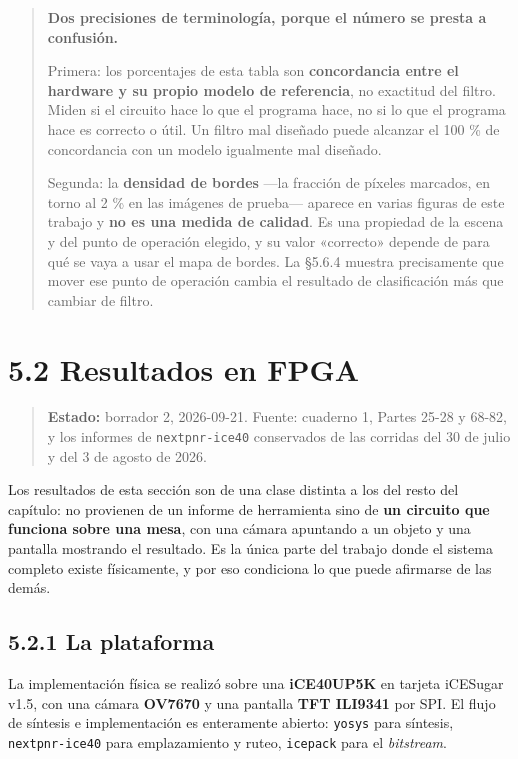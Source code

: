 \begin{quote}
\textbf{Dos precisiones de terminología, porque el número se presta a
confusión.}

Primera: los porcentajes de esta tabla son \textbf{concordancia entre el
hardware y su propio modelo de referencia}, no exactitud del filtro.
Miden si el circuito hace lo que el programa hace, no si lo que el
programa hace es correcto o útil. Un filtro mal diseñado puede alcanzar
el 100 \% de concordancia con un modelo igualmente mal diseñado.

Segunda: la \textbf{densidad de bordes} ---la fracción de píxeles
marcados, en torno al 2 \% en las imágenes de prueba--- aparece en
varias figuras de este trabajo y \textbf{no es una medida de calidad}.
Es una propiedad de la escena y del punto de operación elegido, y su
valor «correcto» depende de para qué se vaya a usar el mapa de bordes.
La §5.6.4 muestra precisamente que mover ese punto de operación cambia
el resultado de clasificación más que cambiar de filtro.
\end{quote}

\section{5.2 Resultados en FPGA}\label{resultados-en-fpga}

\begin{quote}
\textbf{Estado:} borrador 2, 2026-09-21. Fuente: cuaderno 1, Partes
25-28 y 68-82, y los informes de \texttt{nextpnr-ice40} conservados de
las corridas del 30 de julio y del 3 de agosto de 2026.
\end{quote}

Los resultados de esta sección son de una clase distinta a los del resto
del capítulo: no provienen de un informe de herramienta sino de
\textbf{un circuito que funciona sobre una mesa}, con una cámara
apuntando a un objeto y una pantalla mostrando el resultado. Es la única
parte del trabajo donde el sistema completo existe físicamente, y por
eso condiciona lo que puede afirmarse de las demás.

\subsection{5.2.1 La plataforma}\label{la-plataforma}

La implementación física se realizó sobre una \textbf{iCE40UP5K} en
tarjeta iCESugar v1.5, con una cámara \textbf{OV7670} y una pantalla
\textbf{TFT ILI9341} por SPI. El flujo de síntesis e implementación es
enteramente abierto: \texttt{yosys} para síntesis,
\texttt{nextpnr-ice40} para emplazamiento y ruteo, \texttt{icepack} para
el \emph{bitstream}.

